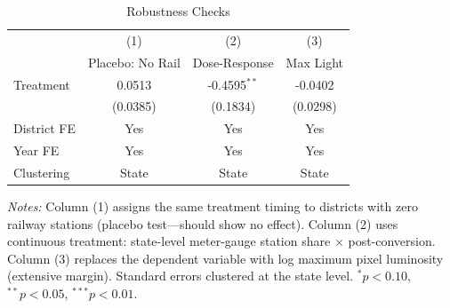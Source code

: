 \begin{table}[htbp]
\centering
\begin{threeparttable}
\caption{Robustness Checks}
\label{tab:robust}
\begin{tabular}{lccc}
\hline\hline
 & (1) & (2) & (3) \\
 & Placebo: No Rail & Dose-Response & Max Light \\
\hline
Treatment & 0.0513 & -0.4595$^{**}$ & -0.0402 \\
 & (0.0385) & (0.1834) & (0.0298) \\
\hline
District FE & Yes & Yes & Yes \\
Year FE & Yes & Yes & Yes \\
Clustering & State & State & State \\
\hline\hline
\end{tabular}
\begin{tablenotes}[flushleft]
\small
\item \textit{Notes:} Column (1) assigns the same treatment timing to districts with zero railway stations (placebo test---should show no effect). Column (2) uses continuous treatment: state-level meter-gauge station share $\times$ post-conversion. Column (3) replaces the dependent variable with log maximum pixel luminosity (extensive margin). Standard errors clustered at the state level. $^{*}p<0.10$, $^{**}p<0.05$, $^{***}p<0.01$.
\end{tablenotes}
\end{threeparttable}
\end{table}


